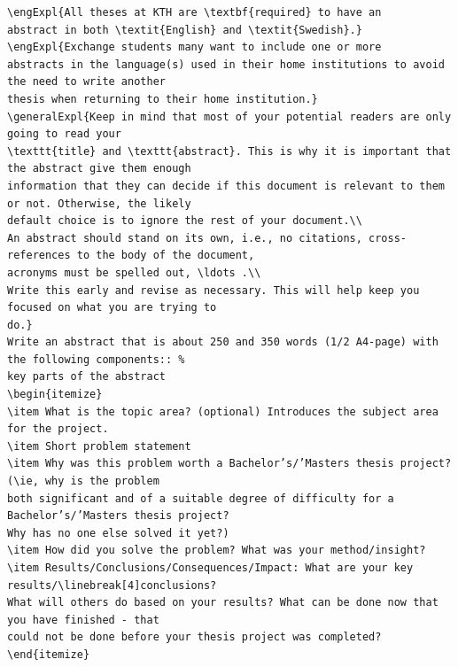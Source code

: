 \begin{lstlisting}[language={[LaTeX]TeX}, caption={\LaTeX~code for the English abstract}, label=lst:latexAbtractsExampleEnglish] 
\engExpl{All theses at KTH are \textbf{required} to have an
abstract in both \textit{English} and \textit{Swedish}.}
\engExpl{Exchange students many want to include one or more
abstracts in the language(s) used in their home institutions to avoid the need to write another
thesis when returning to their home institution.}
\generalExpl{Keep in mind that most of your potential readers are only going to read your
\texttt{title} and \texttt{abstract}. This is why it is important that the abstract give them enough
information that they can decide if this document is relevant to them or not. Otherwise, the likely
default choice is to ignore the rest of your document.\\
An abstract should stand on its own, i.e., no citations, cross-references to the body of the document,
acronyms must be spelled out, \ldots .\\
Write this early and revise as necessary. This will help keep you focused on what you are trying to
do.}
Write an abstract that is about 250 and 350 words (1/2 A4-page) with the following components:: %
key parts of the abstract
\begin{itemize}
\item What is the topic area? (optional) Introduces the subject area for the project.
\item Short problem statement
\item Why was this problem worth a Bachelor’s/’Masters thesis project? (\ie, why is the problem
both significant and of a suitable degree of difficulty for a Bachelor’s/’Masters thesis project?
Why has no one else solved it yet?)
\item How did you solve the problem? What was your method/insight?
\item Results/Conclusions/Consequences/Impact: What are your key results/\linebreak[4]conclusions?
What will others do based on your results? What can be done now that you have finished - that
could not be done before your thesis project was completed?
\end{itemize}
\end{lstlisting}

